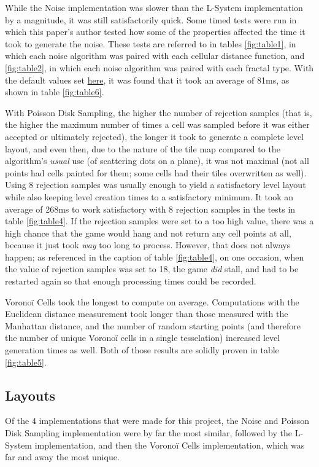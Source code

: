 While the Noise implementation was slower than the L-System implementation by a magnitude, it was still satisfactorily quick. Some timed tests were run in which this paper's author tested how some of the properties affected the time it took to generate the noise. These tests are referred to in tables \ref{fig:table1}, in which each noise algorithm was paired with each cellular distance function, and \ref{fig:table2}, in which each noise algorithm was paired with each fractal type. With the default values set \hyperref[noisedefaults]{here}, it was found that it took an average of 81ms, as shown in table \ref{fig:table6}.

With Poisson Disk Sampling, the higher the number of rejection samples (that is, the higher the maximum number of times a cell was sampled before it was either accepted or ultimately rejected), the longer it took to generate a complete level layout, and even then, due to the nature of the tile map compared to the algorithm's \textit{usual} use (of scattering dots on a plane), it was not maximal (not all points had cells painted for them; some cells had their tiles overwritten as well). Using 8 rejection samples was usually enough to yield a satisfactory level layout while also keeping level creation times to a satisfactory minimum. It took an average of 268ms to work satisfactory with 8 rejection samples in the tests in table \ref{fig:table4}. If the rejection samples were set to a too high value, there was a high  chance that the game would hang and not return any cell points at all, because it just took \textit{way} too long to process. However, that does not always happen; as referenced in the caption of table \ref{fig:table4}, on one occasion, when the value of rejection samples was set to 18, the game \textit{did} stall, and had to be restarted again so that enough processing times could be recorded.

Voronoï Cells took the longest to compute on average. Computations with the Euclidean distance measurement took longer than those measured with the Manhattan distance, and the number of random starting points (and therefore the number of unique Voronoï cells in a single tesselation) increased level generation times as well. Both of those results are solidly proven in table \ref{fig:table5}.

\subsection{Layouts}

Of the 4 implementations that were made for this project, the Noise and Poisson Disk Sampling implementation were by far the most similar, followed by the L-System implementation, and then the Voronoï Cells implementation, which was far and away the most unique.

